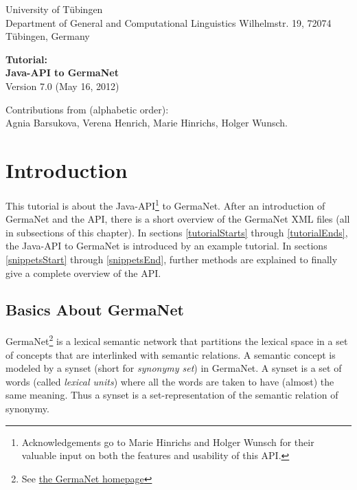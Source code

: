 \documentclass[12pt,a4paper,english,utf8]{report}
\begin{document}
\begin{titlepage}
\begin{flushleft}
{\large University of Tübingen\\
Department of General and Computational Linguistics
Wilhelmstr. 19, 72074 Tübingen, Germany}\\[4.5cm]
\end{flushleft}

\begin{center}
{\huge \bfseries Tutorial:\\[0.4cm]
Java-API to GermaNet}\\[1.0cm]
{\large Version 7.0 (May 16, 2012)}\\[10.0cm]
\end{center}

\begin{flushleft} \small
Contributions from (alphabetic order):\\
Agnia Barsukova, Verena Henrich, Marie Hinrichs, Holger Wunsch.
\end{flushleft}


\end{titlepage}

\tableofcontents
\newpage



\chapter{Introduction}
This tutorial is about the Java-API\footnote{Acknowledgements go to Marie Hinrichs and Holger Wunsch for their valuable input on both the features and usability of this API.} to GermaNet. After an introduction of GermaNet and the API, there is a short overview of the GermaNet XML files (all in subsections of this chapter). In sections \ref{tutorialStarts} through \ref{tutorialEnds}, the Java-API to GermaNet is introduced by an example tutorial. In sections \ref{snippetsStart} through \ref{snippetsEnd}, further methods are explained to finally give a complete overview of the API.



\section{Basics About GermaNet}
GermaNet\footnote{See \href{http://www.sfs.uni-tuebingen.de/GermaNet/}{the GermaNet homepage}} is a lexical semantic network that partitions the lexical space in a set of concepts that are interlinked with semantic relations. A semantic concept is modeled by a synset (short for \emph{synonymy set}) in GermaNet. A synset is a set of words (called \emph{lexical units}) where all the words are taken to have (almost) the same meaning. Thus a synset is a set-representation of the semantic relation of synonymy.
\end{document}
